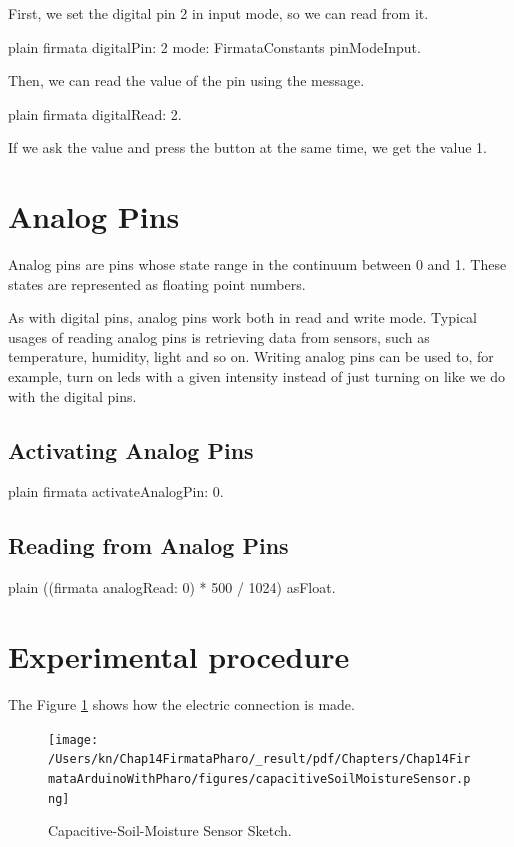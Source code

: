 \documentclass[10pt,twoside,english]{_support/latex/sbabook/sbabook}
\begin{document}
First, we set the digital pin 2 in input mode, so we can read from it.

\begin{displaycode}{plain}
  firmata digitalPin: 2 mode: FirmataConstants pinModeInput.
\end{displaycode}

Then, we can read the value of the pin using the  message.

\begin{displaycode}{plain}
  firmata digitalRead: 2.
\end{displaycode}

If we ask the value and press the button at the same time, we get the value 1.
\section{Analog Pins}
Analog pins are pins whose state range in the continuum between 0 and 1. These states are represented as floating point numbers.

As with digital pins, analog pins work both in read and write mode. 
Typical usages of reading analog pins is retrieving data from sensors, such as temperature, humidity, light and so on. 
Writing analog pins can be used to, for example, turn on leds with a given intensity instead of just turning on like we do with the digital pins.
\subsection{Activating Analog Pins}
\begin{displaycode}{plain}
  firmata activateAnalogPin: 0.
\end{displaycode}
\subsection{Reading from Analog Pins}
\begin{displaycode}{plain}
  ((firmata analogRead: 0) * 500 / 1024) asFloat.
\end{displaycode}
\section{Experimental procedure}
The Figure \ref{Capacitive-Soil-Moisture Sensor Sketch} shows how the electric connection is made.


\begin{figure}

\begin{center}
\texttt{[image: /Users/kn/Chap14FirmataPharo/\_result/pdf/Chapters/Chap14FirmataArduinoWithPharo/figures/capacitiveSoilMoistureSensor.png]}\caption{Capacitive-Soil-Moisture Sensor Sketch.\label{Capacitive-Soil-Moisture Sensor Sketch}}\end{center}
\end{figure}
\end{document}
